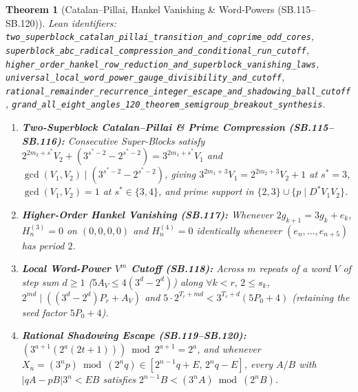 \documentclass[11pt]{article}
\newtheorem{theorem}{Theorem}[section]
\begin{document}
\begin{theorem}[Catalan--Pillai, Hankel Vanishing \& Word-Powers (SB.115--SB.120)]
\emph{Lean identifiers:} \nolinkurl{two_superblock_catalan_pillai_transition_and_coprime_odd_cores}, \nolinkurl{superblock_abc_radical_compression_and_conditional_run_cutoff}, \nolinkurl{higher_order_hankel_row_reduction_and_superblock_vanishing_laws}, \nolinkurl{universal_local_word_power_gauge_divisibility_and_cutoff}, \nolinkurl{rational_remainder_recurrence_integer_escape_and_shadowing_ball_cutoff}, \nolinkurl{grand_all_eight_angles_120_theorem_semigroup_breakout_synthesis}.
\begin{enumerate}
  \item \textbf{Two-Superblock Catalan--Pillai \& Prime Compression (SB.115--SB.116):} Consecutive Super-Blocks satisfy $2^{2m_2+s^*} V_2 + (3^{s^*-2} - 2^{s^*-2}) = 3^{2m_1+s^*} V_1$ and $\gcd(V_1, V_2) \mid (3^{s^*-2} - 2^{s^*-2})$, giving $3^{2m_1+3} V_1 = 2^{2m_2+3} V_2 + 1$ at $s^* = 3$, $\gcd(V_1, V_2) = 1$ at $s^* \in \{3, 4\}$, and prime support in $\{2, 3\} \cup \{p \mid D^* V_1 V_2\}$.
  \item \textbf{Higher-Order Hankel Vanishing (SB.117):} Whenever $2 g_{k+1} = 3 g_k + e_k$, $H_n^{(3)} = 0$ on $(0,0,0,0)$ and $H_n^{(4)} = 0$ identically whenever $(e_n, \dots, e_{n+5})$ has period $2$.
  \item \textbf{Local Word-Power $V^m$ Cutoff (SB.118):} Across $m$ repeats of a word $V$ of step sum $d \ge 1$ ($5 A_V \le 4(3^d - 2^d)$) along $\forall k < r,\, 2 \le s_k$, $2^{m d} \mid ((3^d - 2^d) P_r + A_V)$ and $5 \cdot 2^{T_r + m d} < 3^{T_r + d}(5 P_0 + 4)$ (retaining the seed factor $5 P_0 + 4$).
  \item \textbf{Rational Shadowing Escape (SB.119--SB.120):} $(3^{a+1}(2^a(2t+1))) \bmod 2^{a+1} = 2^a$, and whenever $X_n = (3^n p) \bmod (2^n q) \in [2^{n-1} q + E,\, 2^n q - E]$, every $A/B$ with $|q A - p B| 3^n < E B$ satisfies $2^{n-1} B < (3^n A) \bmod (2^n B)$.
\end{enumerate}
\end{theorem}
\end{document}
